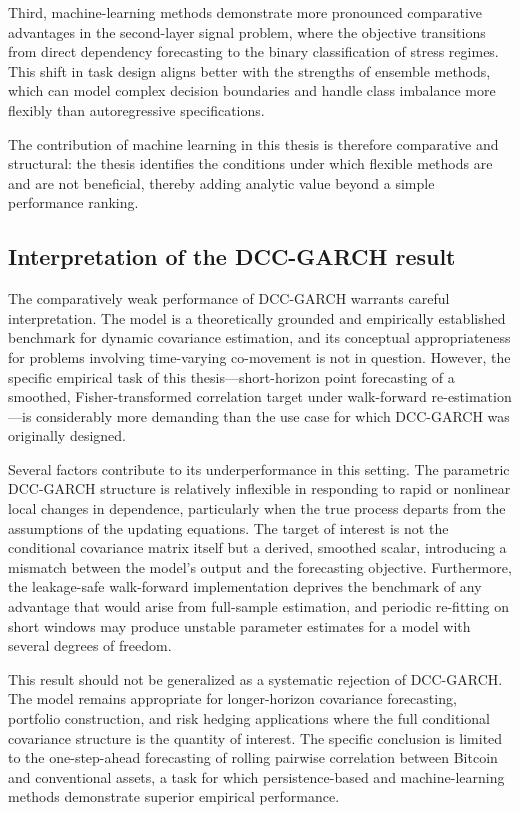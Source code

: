 Third, machine-learning methods demonstrate more pronounced comparative advantages in the second-layer signal problem, where the objective transitions from direct dependency forecasting to the binary classification of stress regimes. This shift in task design aligns better with the strengths of ensemble methods, which can model complex decision boundaries and handle class imbalance more flexibly than autoregressive specifications.

The contribution of machine learning in this thesis is therefore comparative and structural: the thesis identifies the conditions under which flexible methods are and are not beneficial, thereby adding analytic value beyond a simple performance ranking.

\subsection{Interpretation of the DCC-GARCH result}

The comparatively weak performance of DCC-GARCH warrants careful interpretation. The model is a theoretically grounded and empirically established benchmark for dynamic covariance estimation, and its conceptual appropriateness for problems involving time-varying co-movement is not in question. However, the specific empirical task of this thesis---short-horizon point forecasting of a smoothed, Fisher-transformed correlation target under walk-forward re-estimation---is considerably more demanding than the use case for which DCC-GARCH was originally designed.

Several factors contribute to its underperformance in this setting. The parametric DCC-GARCH structure is relatively inflexible in responding to rapid or nonlinear local changes in dependence, particularly when the true process departs from the assumptions of the updating equations. The target of interest is not the conditional covariance matrix itself but a derived, smoothed scalar, introducing a mismatch between the model's output and the forecasting objective. Furthermore, the leakage-safe walk-forward implementation deprives the benchmark of any advantage that would arise from full-sample estimation, and periodic re-fitting on short windows may produce unstable parameter estimates for a model with several degrees of freedom.

This result should not be generalized as a systematic rejection of DCC-GARCH. The model remains appropriate for longer-horizon covariance forecasting, portfolio construction, and risk hedging applications where the full conditional covariance structure is the quantity of interest. The specific conclusion is limited to the one-step-ahead forecasting of rolling pairwise correlation between Bitcoin and conventional assets, a task for which persistence-based and machine-learning methods demonstrate superior empirical performance.

